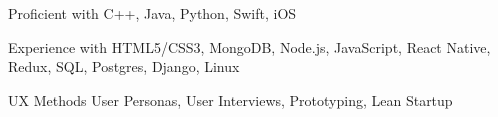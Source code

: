 

\begin{cvskills}
	
	\cvskill
	{Proficient with} %
	{C++, Java, Python, Swift, iOS} %

	\cvskill
	{Experience with} %
	{HTML5/CSS3, MongoDB, Node.js, JavaScript, React Native, Redux, SQL, Postgres, Django, Linux} %
	
	\cvskill
	{UX Methods} %
	{User Personas, User Interviews, Prototyping, Lean Startup} %
	
	
\end{cvskills}
